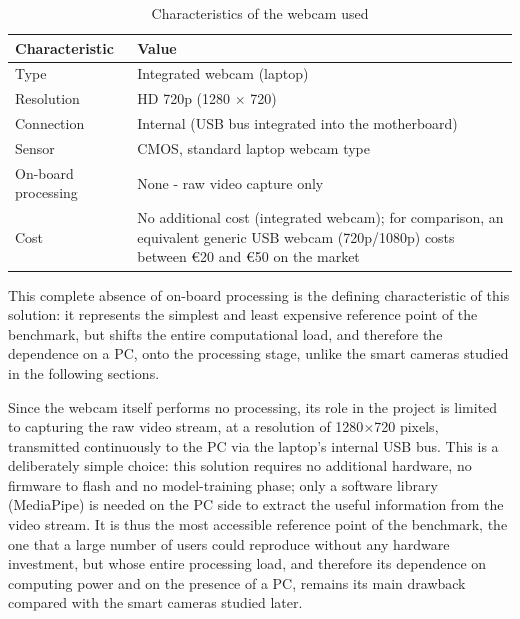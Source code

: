 \documentclass[12pt,a4paper]{report}
\begin{document}
	\begin{table}[H]
		\centering
		\small
		\renewcommand{\arraystretch}{1.15}
		\begin{tabularx}{\textwidth}{|l|X|}
			\hline
			\textbf{Characteristic} & \textbf{Value} \\
			\hline
			Type & Integrated webcam (laptop) \\
			\hline
			Resolution & HD 720p (1280 $\times$ 720) \\
			\hline
			Connection & Internal (USB bus integrated into the motherboard) \\
			\hline
			Sensor & CMOS, standard laptop webcam type \\
			\hline
			On-board processing & None - raw video capture only \\
			\hline
			Cost & No additional cost (integrated webcam); for comparison, an equivalent generic USB webcam (720p/1080p) costs between €20 and €50 on the market \\
			\hline
		\end{tabularx}
		\caption{Characteristics of the webcam used}
		\label{tab:webcam-specs}
	\end{table}
	
	This complete absence of on-board processing is the defining characteristic of this solution: it represents the simplest and least expensive reference point of the benchmark, but shifts the entire computational load, and therefore the dependence on a PC, onto the processing stage, unlike the smart cameras studied in the following sections.
	
	Since the webcam itself performs no processing, its role in the project is limited to capturing the raw video stream, at a resolution of 1280$\times$720 pixels, transmitted continuously to the PC via the laptop's internal USB bus. This is a deliberately simple choice: this solution requires no additional hardware, no firmware to flash and no model-training phase; only a software library (MediaPipe) is needed on the PC side to extract the useful information from the video stream. It is thus the most accessible reference point of the benchmark, the one that a large number of users could reproduce without any hardware investment, but whose entire processing load, and therefore its dependence on computing power and on the presence of a PC, remains its main drawback compared with the smart cameras studied later.
	
	\newpage
	
	
\end{document}
